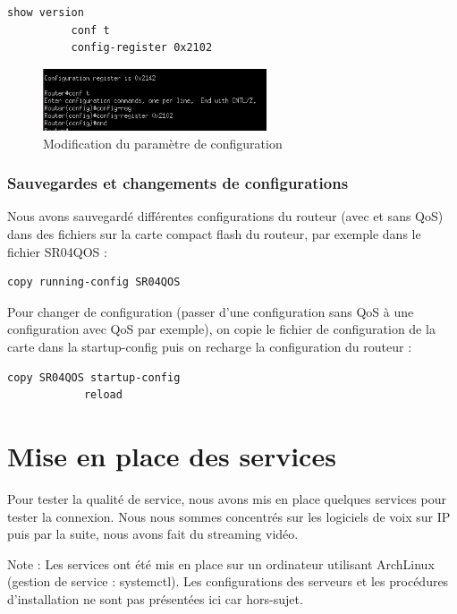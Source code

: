         \begin{lstlisting}[frame=single]
          show version
          conf t
          config-register 0x2102
        \end{lstlisting}
        
	    \begin{figure}[h]
        \includegraphics[width=250px]{figures/config-register_0x2102.png}
        \centering
        \caption{Modification du paramètre de configuration}
        \end{figure}

	\subsubsection{Sauvegardes et changements de configurations}

		Nous avons sauvegardé différentes configurations du routeur (avec et sans QoS) dans des fichiers sur la carte compact flash du routeur, par exemple dans le fichier SR04QOS : 
        \begin{lstlisting}[frame=single]
          copy running-config SR04QOS
        \end{lstlisting}
        
        Pour changer de configuration (passer d'une configuration sans QoS à une configuration avec QoS par exemple), on copie le fichier de configuration de la carte dans la startup-config puis on recharge la configuration du routeur :
        
        \begin{lstlisting}[frame=single]
            copy SR04QOS startup-config
            reload
        \end{lstlisting}


    \section{Mise en place des services}
    
    Pour tester la qualité de service, nous avons mis en place quelques services pour tester la connexion. Nous nous sommes concentrés sur les logiciels de voix sur IP puis par la suite, nous avons fait du streaming vidéo. 
    
    Note : Les services ont été mis en place sur un ordinateur utilisant ArchLinux (gestion de service : systemctl). Les configurations des serveurs et les procédures d'installation ne sont pas présentées ici car hors-sujet.
    
